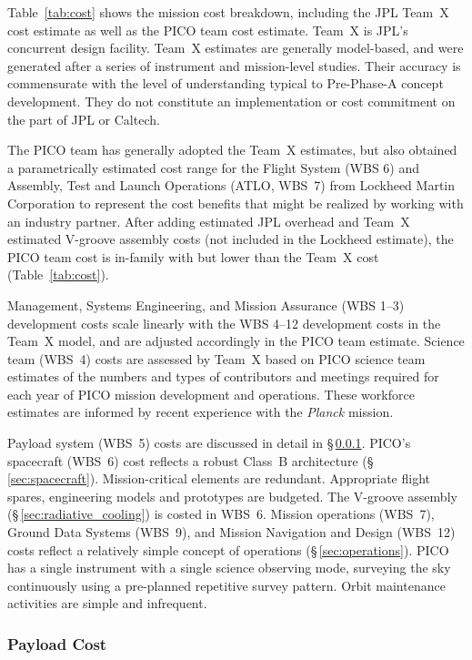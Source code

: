 Table~\ref{tab:cost} shows the mission cost breakdown, including the
JPL Team~X cost estimate as well as the PICO team cost estimate. Team~X
 is JPL's concurrent design facility. Team~X estimates are generally
model-based, and were generated after a series of instrument and
mission-level studies. Their accuracy is commensurate with the level
of understanding typical to Pre-Phase-A concept development. They do
not constitute an implementation or cost commitment on the part of JPL
or Caltech.


The PICO team has generally adopted the Team~X estimates, but also
obtained a parametrically estimated cost range for the Flight System
(WBS 6) and Assembly, Test and Launch Operations (ATLO, WBS~7) from
Lockheed Martin Corporation to represent the cost benefits that might
be realized by working with an industry partner. After adding
estimated JPL overhead and Team~X estimated V-groove assembly costs
(not included in the Lockheed estimate), the PICO team cost is
in-family with but lower than the Team~X cost (Table~\ref{tab:cost}).

Management, Systems Engineering, and Mission Assurance (WBS 1--3)
development costs scale linearly with the WBS 4--12 development costs
in the Team~X model, and are adjusted accordingly in the PICO team
estimate. Science team (WBS~4) costs are assessed by Team~X based on PICO
science team estimates of the numbers and types of contributors and
meetings required for each year of PICO mission development and
operations. These workforce estimates are informed by recent
experience with the \textit{Planck} mission.

Payload system (WBS~5) costs are discussed in detail in
\S\,\ref{sec:instrument_cost}.  PICO's spacecraft (WBS~6) cost
reflects a robust Class~B architecture
(\S\,\ref{sec:spacecraft}). Mission-critical elements are
redundant. Appropriate flight spares, engineering models and
prototypes are budgeted. The V-groove assembly (\S\,\ref{sec:radiative_cooling})
is costed in WBS~6.  Mission operations (WBS~7), Ground Data Systems
(WBS~9), and Mission Navigation and Design (WBS~12) costs reflect a
relatively simple concept of operations (\S\,\ref{sec:operations}). PICO has a single
instrument with a single science observing mode, surveying the sky
continuously using a pre-planned repetitive survey pattern. Orbit
maintenance activities are simple and infrequent.

\subsubsection{Payload Cost}
\label{sec:instrument_cost} %

